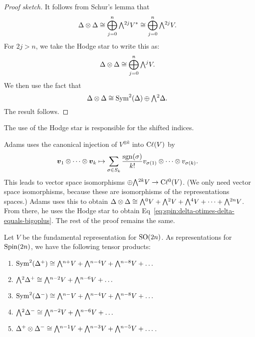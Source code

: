 \begin{proof}[Proof sketch]
  It follows from Schur's lemma that
  \begin{equation}
\Delta\otimes\Delta\iso\bigoplus^{n}_{j=0}\Exterior^{2j}V^{*}\iso\bigoplus^{n}_{j=0}\Exterior^{2j}V.
  \end{equation}
  For $2j>n$, we take the Hodge star to write this as:
  \begin{equation}\label{eq:spin:delta-otimes-delta-equals-bigoplus}
\Delta\otimes\Delta\iso\bigoplus^{n}_{j=0}\Exterior^{j}V.
  \end{equation}
  We then use the fact that
  \begin{equation}
\Delta\otimes\Delta\iso\Sym^{2}(\Delta)\oplus\Exterior^{2}\Delta.
  \end{equation}
  The result follows.
\end{proof}

\begin{remark}
The use of the Hodge star is responsible for the shifted indices.
\end{remark}

\begin{remark}
Adams uses the canonical injection of $V^{\otimes k}$ into $\mathrm{C}\ell(V)$
by
\begin{equation}
\boldsymbol{v}_{1}\otimes\dots\otimes\boldsymbol{v}_{k}\mapsto\sum_{\sigma\in S_{k}}\frac{\operatorname{sgn}(\sigma)}{k!}v_{\sigma(1)}\otimes\dots\otimes v_{\sigma(k)}.
\end{equation}
This leads to vector space isomorphisms $\oplus\Exterior^{2k}V\to\Cl^{0}(V)$.
(We only need vector space isomorphisms, because these are isomorphisms
of the representations spaces.)
Adams uses this to obtain $\Delta\otimes\Delta\iso\Exterior^{0}V + \Exterior^{2}V + \Exterior^{4}V + \dots + \Exterior^{2n}V$.
From there, he uses the Hodge star to obtain Eq~\eqref{eq:spin:delta-otimes-delta-equals-bigoplus}.
The rest of the proof remains the same.
\end{remark}

\begin{theorem}
Let $V$ be the fundamental representation for $\operatorname{SO}(2n)$. As
representations for $\operatorname{Spin}(2n)$, we have the following tensor products:
\begin{enumerate}
\item $\Sym^{2}(\Delta^{+}) \iso \Exterior^{n+}V + \Exterior^{n-4}V + \Exterior^{n-8}V+\dots$
\item $\Exterior^{2}\Delta^{+} \iso \Exterior^{n-2}V + \Exterior^{n-6}V + \dots$
\item $\Sym^{2}(\Delta^{-}) \iso \Exterior^{n-}V + \Exterior^{n-4}V + \Exterior^{n-8}V+\dots$
\item $\Exterior^{2}\Delta^{-} \iso \Exterior^{n-2}V + \Exterior^{n-6}V + \dots$
\item $\Delta^{+}\otimes\Delta^{-}\iso\Exterior^{n-1}V + \Exterior^{n-3}V + \Exterior^{n-5}V + \dots$.
\end{enumerate}
\end{theorem}

